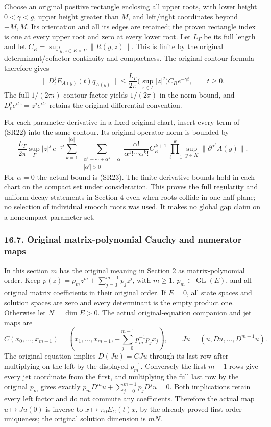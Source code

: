 \documentclass[
  11pt,
]{article}
\begin{document}
Choose an original positive rectangle enclosing all upper roots, with
lower height \(0<\gamma<g\), upper height greater than \(M\), and
left/right coordinates beyond \(-M,M\). Its orientation and all its
edges are retained; the proven rectangle index is one at every upper
root and zero at every lower root. Let \(L_\Gamma\) be its full length
and let \(C_R=\sup_{y,z\in K\times\Gamma}\|R(y,z)\|\). This is finite by
the original determinant/cofactor continuity and compactness. The
original contour formula therefore gives \[
 \|D_t^jE_{A(y)}(t)q_{A(y)}\|
 \leq \frac{L_\Gamma}{2\pi}
       \bigl(\sup_{z\in\Gamma}|z|^j\bigr) C_R e^{-\gamma t},
                     \qquad t\geq0.                          \tag{SR23}
\] The full \(1/(2\pi i)\) contour factor yields \(1/(2\pi)\) in the
norm bound, and \(D_t^j e^{itz}=z^j e^{itz}\) retains the original
differential convention.

For each parameter derivative in a fixed original chart, insert every
term of (SR22) into the same contour. Its original operator norm is
bounded by \[
 \frac{L_\Gamma}{2\pi}\sup_\Gamma|z|^j\, e^{-\gamma t}
 \sum_{k=1}^{|\alpha|}
 \ \sum_{\substack{\alpha^1+\cdots+\alpha^k=\alpha\\
                   |\alpha^\ell|>0}}
   \frac{\alpha!}{\alpha^1!\cdots\alpha^k!}
   C_R^{\,k+1}\prod_{\ell=1}^k
          \sup_{y\in K}\|\partial^{\alpha^\ell}A(y)\|.          \tag{SR24}
\] For \(\alpha=0\) the actual bound is (SR23). The finite derivative
bounds hold in each chart on the compact set under consideration. This
proves the full regularity and uniform decay statements in Section 4
even when roots collide in one half-plane; no selection of individual
smooth roots was used. It makes no global gap claim on a noncompact
parameter set.

\subsubsection{16.7. Original matrix-polynomial Cauchy and numerator
maps}\label{original-matrix-polynomial-cauchy-and-numerator-maps}

In this section \(m\) has the original meaning in Section 2 as
matrix-polynomial order. Keep \(p(z)=p_m z^m+\sum_{j=0}^{m-1}p_jz^j\),
with \(m\geq1\), \(p_m\in\operatorname{GL}(E)\), and all original matrix
coefficients in their original order. If \(E=0\), all state spaces and
solution spaces are zero and every determinant is the empty product one.
Otherwise let \(N=\dim E>0\). The actual original-equation companion and
jet maps are \[
 C(x_0,\ldots,x_{m-1})
  =(x_1,\ldots,x_{m-1},-\sum_{j=0}^{m-1}p_m^{-1}p_jx_j),
 \qquad Ju=(u,Du,\ldots,D^{m-1}u).                            \tag{SR25}
\] The original equation implies \(D(Ju)=CJu\) through its last row
after multiplying on the left by the displayed \(p_m^{-1}\). Conversely
the first \(m-1\) rows give every jet coordinate from the first, and
multiplying the full last row by the original \(p_m\) gives exactly
\(p_mD^mu+\sum_{j=0}^{m-1}p_jD^ju=0\). Both implications retain every
left factor and do not commute any coefficients. Therefore the actual
map \(u\mapsto Ju(0)\) is inverse to \(x\mapsto \pi_0 E_C(t)x\), by the
already proved first-order uniqueness; the original solution dimension
is \(mN\).
\end{document}
